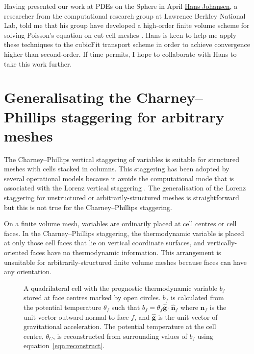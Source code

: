 \documentclass[a4paper,11pt]{article}
\begin{document}
Having presented our work at PDEs on the Sphere in April \href{http://crd.lbl.gov/departments/applied-mathematics/ANAG/about/staff-and-postdocs/hans-johansen/}{Hans Johansen}, a researcher from the computational research group at Lawrence Berkley National Lab, told me that his group have developed a high-order finite volume scheme for solving Poisson's equation on cut cell meshes \citep{devendran2015}.  Hans is keen to help me apply these techniques to the cubicFit transport scheme in order to achieve convergence higher than second-order.  If time permits, I hope to collaborate with Hans to take this work further.

\section{Generalisating the Charney--Phillips staggering for arbitrary meshes}

The Charney--Phillips vertical staggering of variables \citep{charney-phillips1953} is suitable for structured meshes with cells stacked in columns. This staggering has been adopted by several operational models \citep{davies2005,yang2007,girard2014} because it avoids the computational mode that is associated with the Lorenz vertical staggering \citep{arakawa-konor1996}. The generalisation of the Lorenz staggering for unstructured or arbitrarily-structured meshes is straightforward \citep{weller-shahrokhi2014} but this is not true for the Charney--Phillips staggering.

On a finite volume mesh, variables are ordinarily placed at cell centres or cell faces. In the Charney--Phillips staggering, the thermodynamic variable is placed at only those cell faces that lie on vertical coordinate surfaces, and vertically-oriented faces have no thermodynamic information. This arrangement is unsuitable for arbitrarily-structured finite volume meshes because faces can have any orientation.

\begin{figure}
\centering

	\caption{A quadrilateral cell with the prognostic thermodynamic variable $b_f$ stored at face centres marked by open circles.  $b_f$ is calculated from the potential temperature $\theta_f$ such that $b_f = \theta_f \mathbf{\hat{g}} \cdot \mathbf{\hat{n}}_f$ where $\mathbf{\hat{n}}_f$ is the unit vector outward normal to face $f$, and $\mathbf{\hat{g}}$ is the unit vector of gravitational acceleration.  The potential temperature at the cell centre, $\theta_C$, is reconstructed from surrounding values of $b_f$ using equation~\eqref{eqn:reconstruct}.}
\label{fig:cp-staggering}
\end{figure}
\end{document}
